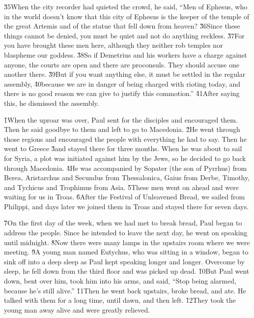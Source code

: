 \v{35}When the city recorder had quieted the crowd, he said, ``Men of Ephesus, who in the world doesn't know that this city of Ephesus is the keeper of the temple of the great Artemis and of the statue that fell down from heaven? \v{36}Since these things cannot be denied, you must be quiet and not do anything reckless. \v{37}For you have brought these men here, although they neither rob temples nor blaspheme our goddess. \v{38}So if Demetrius and his workers have a charge against anyone, the courts are open and there are proconsuls. They should accuse one another there. \v{39}But if you want anything else, it must be settled in the regular assembly, \v{40}because we are in danger of being charged with rioting today, and there is no good reason we can give to justify this commotion.'' \v{41}After saying this, he dismissed the assembly.

\v{1}When the uproar was over, Paul sent for the disciples and encouraged them. Then he said goodbye to them and left to go to Macedonia. \v{2}He went through those regions and encouraged the people with everything he had to say. Then he went to Greece \v{3}and stayed there for three months. When he was about to sail for Syria, a plot was initiated against him by the Jews, so he decided to go back through Macedonia. \v{4}He was accompanied by Sopater (the son of Pyrrhus) from Berea, Aristarchus and Secundus from Thessalonica, Gaius from Derbe, Timothy, and Tychicus and Trophimus from Asia. \v{5}These men went on ahead and were waiting for us in Troas. \v{6}After the Festival of Unleavened Bread, we sailed from Philippi, and days later we joined them in Troas and stayed there for seven days.

\v{7}On the first day of the week, when we had met to break bread, Paul began to address the people. Since he intended to leave the next day, he went on speaking until midnight. \v{8}Now there were many lamps in the upstairs room where we were meeting. \v{9}A young man named Eutychus, who was sitting in a window, began to sink off into a deep sleep as Paul kept speaking longer and longer. Overcome by sleep, he fell down from the third floor and was picked up dead. \v{10}But Paul went down, bent over him, took him into his arms, and said, ``Stop being alarmed, because he's still alive.'' \v{11}Then he went back upstairs, broke bread, and ate. He talked with them for a long time, until dawn, and then left. \v{12}They took the young man away alive and were greatly relieved.

